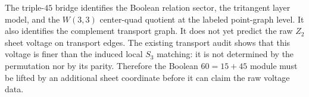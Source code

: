 
\makeatletter
{}
\makeatother
\providecommand{\PSp}{\mathrm{PSp}}
\providecommand{\Aut}{\mathrm{Aut}}
\providecommand{\spec}{\operatorname{spec}}


\begin{remark}
\label{rem:triple-fortyfive-z2-obstruction}
The triple-$45$ bridge identifies the Boolean relation sector, the tritangent
layer model, and the $W(3,3)$ center-quad quotient at the labeled point-graph
level.  It also identifies the complement transport graph.  It does not yet
predict the raw $Z_2$ sheet voltage on transport edges.  The existing transport
audit shows that this voltage is finer than the induced local $S_3$ matching: it
is not determined by the permutation nor by its parity.  Therefore the Boolean
$60=15+45$ module must be lifted by an additional sheet coordinate before it can
claim the raw voltage data.
\end{remark}
